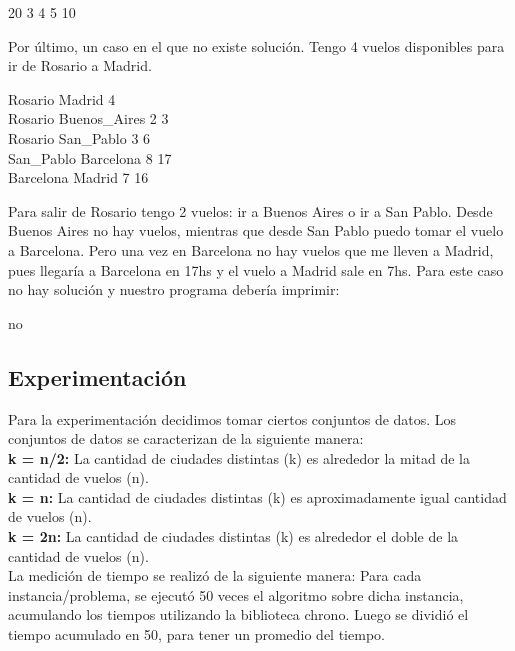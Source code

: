 \begin{codebox}
20 3 4 5 10\\
\end{codebox}

Por último, un caso en el que no existe solución. Tengo 4 vuelos disponibles para ir de Rosario a Madrid.
\begin{codebox}
Rosario Madrid 4\\
Rosario Buenos\_Aires 2 3\\
Rosario San\_Pablo 3 6\\
San\_Pablo Barcelona 8 17\\
Barcelona Madrid 7 16\\
\end{codebox}

Para salir de Rosario tengo 2 vuelos: ir a Buenos Aires o ir a San Pablo. Desde Buenos Aires no hay vuelos, mientras que desde San Pablo puedo 
tomar el vuelo a Barcelona. Pero una vez en Barcelona no hay vuelos que me lleven a Madrid, pues llegaría a Barcelona en 17hs y el vuelo a Madrid 
sale en 7hs. Para este caso no hay solución y nuestro programa debería imprimir:
\begin{codebox}
no\\
\end{codebox}

\subsection{Experimentación}

Para la experimentación decidimos tomar ciertos conjuntos de datos. Los conjuntos de datos se caracterizan de la siguiente manera:\\

\textbf{k = n/2:} La cantidad de ciudades distintas (k) es alrededor la mitad de la cantidad de vuelos (n).\\
\indent \textbf{k = n:} La cantidad de ciudades distintas (k) es aproximadamente igual cantidad de vuelos (n).\\
\indent \textbf{k = 2n:} La cantidad de ciudades distintas (k) es alrededor el doble de la cantidad de vuelos (n).\\

La medición de tiempo se realizó de la siguiente manera: Para cada instancia/problema, se ejecutó 50 veces el algoritmo sobre dicha instancia,
acumulando los tiempos utilizando la biblioteca chrono. Luego se dividió el tiempo acumulado en 50, para tener un promedio del tiempo.

